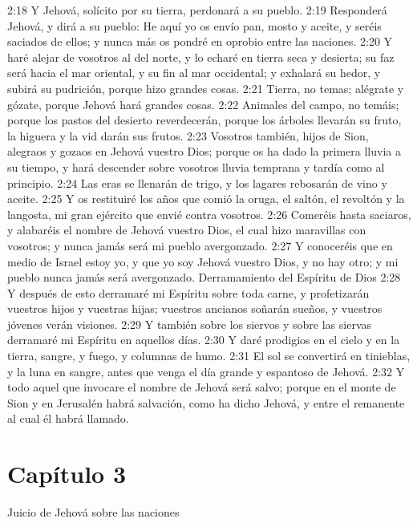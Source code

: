2:18 Y Jehová, solícito por su tierra, perdonará a su pueblo.  
2:19 Responderá Jehová, y dirá a su pueblo: He aquí yo os envío pan, mosto y aceite, y seréis saciados de ellos; y nunca más os pondré en oprobio entre las naciones.  
2:20 Y haré alejar de vosotros al del norte, y lo echaré en tierra seca y desierta; su faz será hacia el mar oriental, y su fin al mar occidental; y exhalará su hedor, y subirá su pudrición, porque hizo grandes cosas.  
2:21 Tierra, no temas; alégrate y gózate, porque Jehová hará grandes cosas.  
2:22 Animales del campo, no temáis; porque los pastos del desierto reverdecerán, porque los árboles llevarán su fruto, la higuera y la vid darán sus frutos.  
2:23 Vosotros también, hijos de Sion, alegraos y gozaos en Jehová vuestro Dios; porque os ha dado la primera lluvia a su tiempo, y hará descender sobre vosotros lluvia temprana y tardía como al principio.  
2:24 Las eras se llenarán de trigo, y los lagares rebosarán de vino y aceite.  
2:25 Y os restituiré los años que comió la oruga, el saltón, el revoltón y la langosta, mi gran ejército que envié contra vosotros.  
2:26 Comeréis hasta saciaros, y alabaréis el nombre de Jehová vuestro Dios, el cual hizo maravillas con vosotros; y nunca jamás será mi pueblo avergonzado.  
2:27 Y conoceréis que en medio de Israel estoy yo, y que yo soy Jehová vuestro Dios, y no hay otro; y mi pueblo nunca jamás será avergonzado.  
Derramamiento del Espíritu de Dios  
2:28 Y después de esto derramaré mi Espíritu sobre toda carne, y profetizarán vuestros hijos y vuestras hijas; vuestros ancianos soñarán sueños, y vuestros jóvenes verán visiones.  
2:29 Y también sobre los siervos y sobre las siervas derramaré mi Espíritu en aquellos días.  
2:30 Y daré prodigios en el cielo y en la tierra, sangre, y fuego, y columnas de humo.  
2:31 El sol se convertirá en tinieblas, y la luna en sangre, antes que venga el día grande y espantoso de Jehová.  
2:32 Y todo aquel que invocare el nombre de Jehová será salvo; porque en el monte de Sion y en Jerusalén habrá salvación, como ha dicho Jehová, y entre el remanente al cual él habrá llamado. 
\section*{Capítulo 3 } 
Juicio de Jehová sobre las naciones  
  
